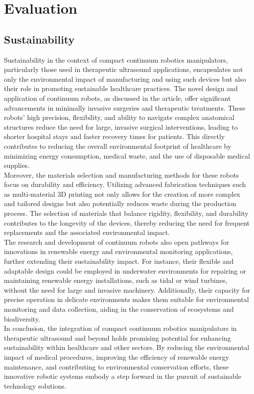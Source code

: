 \section{Evaluation}
\subsection{Sustainability}
Sustainability in the context of compact continuum robotics manipulators, particularly those used in therapeutic 
ultrasound applications, encapsulates not only the environmental impact of manufacturing and using such devices 
but also their role in promoting sustainable healthcare practices. The novel design and application of continuum 
robots, as discussed in the article, offer significant advancements in minimally invasive surgeries and therapeutic 
treatments. These robots' high precision, flexibility, and ability to navigate complex anatomical structures reduce 
the need for large, invasive surgical interventions, leading to shorter hospital stays and faster recovery times for 
patients. This directly contributes to reducing the overall environmental footprint of healthcare by minimizing energy 
consumption, medical waste, and the use of disposable medical supplies. \\
Moreover, the materials selection and manufacturing methods for these robots focus on durability and efficiency. Utilizing 
advanced fabrication techniques such as multi-material 3D printing not only allows for the creation of more complex and 
tailored designs but also potentially reduces waste during the production process. The selection of materials that balance 
rigidity, flexibility, and durability contributes to the longevity of the devices, thereby reducing the need for frequent 
replacements and the associated environmental impact. \\
The research and development of continuum robots also open pathways for innovations in renewable energy and environmental 
monitoring applications, further extending their sustainability impact. For instance, their flexible and adaptable design 
could be employed in underwater environments for repairing or maintaining renewable energy installations, such as tidal 
or wind turbines, without the need for large and invasive machinery. Additionally, their capacity for precise operation 
in delicate environments makes them suitable for environmental monitoring and data collection, aiding in the conservation 
of ecosystems and biodiversity. \\
In conclusion, the integration of compact continuum robotics manipulators in therapeutic ultrasound and beyond holds 
promising potential for enhancing sustainability within healthcare and other sectors. By reducing the environmental 
impact of medical procedures, improving the efficiency of renewable energy maintenance, and contributing to environmental 
conservation efforts, these innovative robotic systems embody a step forward in the pursuit of sustainable technology solutions. 







\newpage